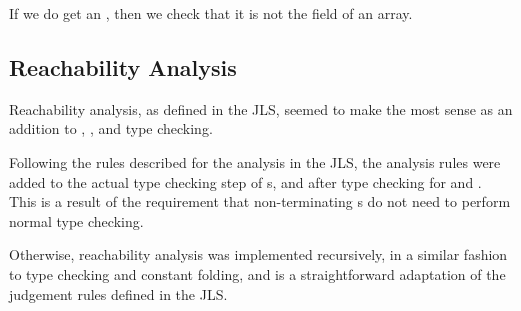 \documentclass[pdftex,11pt,a4paper]{article}
\begin{document}
If we do get an , then we check that it is not the
 field of an array.


\subsection{Reachability Analysis}

Reachability analysis, as defined in the JLS, seemed to make the most
sense as an addition to , , and 
type checking.

Following the rules described for the analysis in the JLS, the
analysis rules were added to the actual type checking step of
s, and after type checking for  and
. This is a result of the requirement that
non-terminating s do not need to perform normal type
checking.

Otherwise, reachability analysis was implemented recursively, in a
similar fashion to type checking and constant folding, and is a
straightforward adaptation of the judgement rules defined in the JLS.
\end{document}
